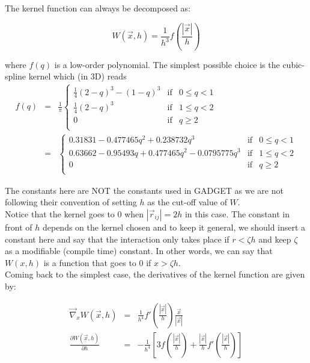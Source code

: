 \documentclass[a4paper,10pt]{report}
\begin{document}
The kernel function can always be decomposed as:

\begin{equation}
 W(\vec{x}, h) = \frac{1}{h^3}f\left(\frac{|\vec{x}|}{h}\right) 
\end{equation}

where $f(q)$ is a low-order polynomial. The simplest possible choice is the cubic-spline kernel which (in 3D) reads
\begin{eqnarray*}
 f(q) &=& \frac{1}{\pi}\left\lbrace \begin{array}{rcl}
                      \frac{1}{4}(2-q)^3 - (1-q)^3 & \mbox{if} & 0 \leq q < 1 \\
		      \frac{1}{4}(2-q)^3 & \mbox{if} & 1 \leq q < 2 \\
		      0 & \mbox{if} & q \geq 2 \\
                     \end{array}
 \right. \\
&=&\left\lbrace \begin{array}{rcl}
    0.31831 -0.477465 q^2+0.238732 q^3& \mbox{if} & 0 \leq q < 1 \\
   0.63662 -0.95493 q+0.477465 q^2-0.0795775 q^3  & \mbox{if} & 1 \leq q < 2 \\
		      0 & \mbox{if} & q \geq 2 \\
                     \end{array}
 \right.
\end{eqnarray*}

The constants here are NOT the constants used in GADGET as we are not following their convention of setting $h$ as the
cut-off value of $W$.\\
Notice that the kernel goes to $0$ when $|\vec{r}_{ij}| = 2h$ in this case. The constant in front of $h$ depends on the
kernel
chosen and to keep it general, we should insert a constant here and say that the interaction only takes place if
$r<\zeta h$ and keep $\zeta$ as a modifiable (compile time) constant. In other words, we can say that $W(x,h)$ is a
function that goes to $0$ if $x > \zeta h$. \\
Coming back to the simplest case, the derivatives of the kernel function are given by:

\begin{eqnarray*}
 \vec\nabla_x W(\vec{x},h) &=& \frac{1}{h^4}f'\left(\frac{|\vec{x}|}{h}\right) \frac{\vec{x}}{|\vec{x}|} \\
 \frac{\partial W(\vec{x},h)}{\partial h} &=&- \frac{1}{h^4}\left[3f\left(\frac{|\vec{x}|}{h}\right) + 
\frac{|\vec{x}|}{h}f'\left(\frac{|\vec{x}|}{h}\right)\right]
\end{eqnarray*}
\end{document}
